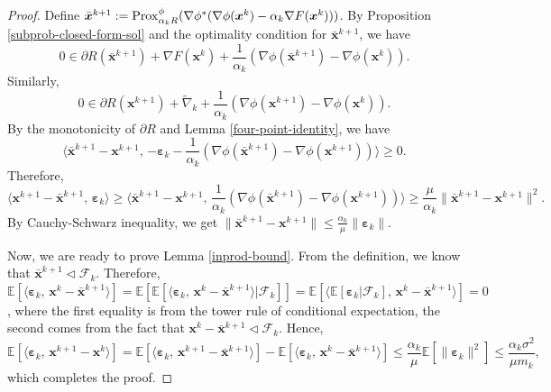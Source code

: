\documentclass[twoside,11pt]{article}
\newcommand{\E}{\mathbb{E}}
\newcommand{\cF}{\mathcal F}
\newcommand{\wtnabla}{\widetilde\nabla}
\def\inprod#1#2{\langle#1,\,#2\rangle}
\def\vx{{\bm{x}}}
\begin{document}
\begin{proof}
Define ${\bar\vx}^{k+1}:= {{\rm Prox}_{\alpha_kR}^\phi} (\nabla\phi^*(\nabla\phi({\vx^k})-\alpha_k\nabla F({\vx^k})))$. By Proposition \ref{subprob-closed-form-sol} and 
the optimality condition for {${\bar\vx}^{k+1}$}, we have
\[
0\in\partial R({\bar\vx}^{k+1})+\nabla F({\vx^k})+\frac{1}{\alpha_k}(\nabla\phi({\bar\vx}^{k+1})-\nabla\phi({\vx^k})).
\]
Similarly,
\[
0\in\partial R({\vx^{k+1}})+\wtnabla_k+\frac{1}{\alpha_k}(\nabla\phi({\vx^{k+1}})-\nabla\phi({\vx^k})).
\]
By the monotonicity of $\partial R$ and Lemma \ref{four-point-identity}, we have
\[
\big\langle{{\bar\vx}^{k+1}-{\vx^{k+1}}},\,
{-{\bm\varepsilon}_k-\frac{1}{\alpha_k}(\nabla\phi({\bar\vx}^{k+1})-\nabla\phi({\vx^{k+1}}))}
\big\rangle
\geq0.
\]
Therefore, 
\[
\inprod{{\vx^{k+1}}-{\bar\vx}^{k+1}}{{\bm\varepsilon}_k}\geq
\inprod{{\bar\vx}^{k+1}-{\vx^{k+1}}}{\frac{1}{\alpha_k}(\nabla\phi({\bar\vx}^{k+1})-\nabla\phi({\vx^{k+1}}))}\geq\frac{\mu}{\alpha_k}\|{\bar\vx}^{k+1}-{\vx^{k+1}}\|^2.
\]
By Cauchy-Schwarz inequality, we get $\|{\bar\vx}^{k+1}-{\vx^{k+1}}\|\leq\frac{\alpha_k}{\mu}\|{\bm\varepsilon}_k\|$.  

Now, we are ready to prove Lemma \ref{inprod-bound}. From the definition, we know that ${\bar\vx}^{k+1}\vartriangleleft\cF_k$. Therefore, $\E[\inprod{{\bm\varepsilon}_k}{{\vx^k}-{\bar\vx}^{k+1}}]=\E[\E[\inprod{{\bm\varepsilon}_k}{{\vx^k}-{\bar\vx}^{k+1}}|\cF_k]]=\E[\inprod{\E[{\bm\varepsilon}_k|\cF_k]}{{\vx^k}-{\bar\vx}^{k+1}}]=0$, {where} the first equality is from the tower rule of conditional expectation, the second comes from {the fact} that ${\vx^k}-{\bar\vx}^{k+1}\vartriangleleft\cF_k$. Hence,
{\small
\[
\mathbb E\left[\inprod{{\bm\varepsilon}_k}{{\vx^{k+1}}-\vx^{k}}\right]=\E\left[\inprod{{\bm\varepsilon}_k}{{\vx^{k+1}}-{\bar\vx}^{k+1}}\right]-\E\left[\inprod{{\bm\varepsilon}_k}{{\vx^k}-{\bar\vx}^{k+1}}\right]\leq\frac{\alpha_k}{\mu}\E[\|{\bm\varepsilon}_k\|^2]\leq\frac{\alpha_k\sigma^2}{\mu m_k},
\]}
which completes the proof.
\end{proof}
 
\end{document}
